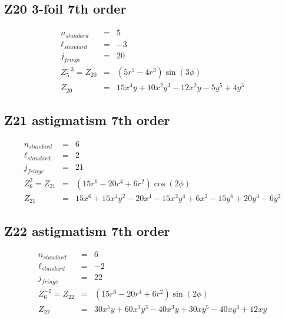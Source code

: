 \documentclass[10pt]{article}
\begin{document}
  \subsection{Z20 3-foil 7th order}
    \begin{subequations}
    \begin{eqnarray}
        n_{standard} &=&5\\
        \ell_{standard} &=&-3\\
        j_{fringe} &=&20\\
        Z_{5}^{-3} = Z_{20} &=& \left(5 r^{5} - 4 r^{3}\right) \sin{\left(3 \phi \right)}\\
        Z_{20} &=& 15 x^{4} y + 10 x^{2} y^{3} - 12 x^{2} y - 5 y^{5} + 4 y^{3}
    \end{eqnarray}
    \end{subequations}
  \subsection{Z21 astigmatism 7th order}
    \begin{subequations}
    \begin{eqnarray}
        n_{standard} &=&6\\
        \ell_{standard} &=&2\\
        j_{fringe} &=&21\\
        Z_{6}^{2} = Z_{21} &=& \left(15 r^{6} - 20 r^{4} + 6 r^{2}\right) \cos{\left(2 \phi \right)}\\
        Z_{21} &=& 15 x^{6} + 15 x^{4} y^{2} - 20 x^{4} - 15 x^{2} y^{4} + 6 x^{2} - 15 y^{6} + 20 y^{4} - 6 y^{2}
    \end{eqnarray}
    \end{subequations}
  \subsection{Z22 astigmatism 7th order}
    \begin{subequations}
    \begin{eqnarray}
        n_{standard} &=&6\\
        \ell_{standard} &=&-2\\
        j_{fringe} &=&22\\
        Z_{6}^{-2} = Z_{22} &=& \left(15 r^{6} - 20 r^{4} + 6 r^{2}\right) \sin{\left(2 \phi \right)}\\
        Z_{22} &=& 30 x^{5} y + 60 x^{3} y^{3} - 40 x^{3} y + 30 x y^{5} - 40 x y^{3} + 12 x y
    \end{eqnarray}
    \end{subequations}
\end{document}
